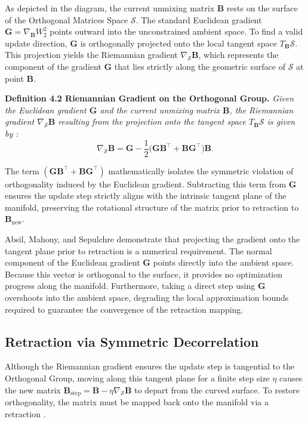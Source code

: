\documentclass[12pt,a4paper,twoside,openany]{book}
\begin{document}
As depicted in the diagram, the current unmixing matrix $\mathbf{B}$ rests on the surface of the Orthogonal Matrices Space $\mathcal{S}$. 
The standard Euclidean gradient $\mathbf{G} = \nabla_{\mathbf{B}} W_2^2$ points outward into the unconstrained ambient space. 
To find a valid update direction, $\mathbf{G}$ is orthogonally projected onto the local tangent space $T_{\mathbf{B}}\mathcal{S}$. 
This projection yields the Riemannian gradient $\nabla_{\mathcal{S}} \mathbf{B}$, which represents the component of the gradient $\mathbf{G}$ 
that lies strictly along the geometric surface of $\mathcal{S}$ at point $\mathbf{B}$.

\vspace{0.5em}
\noindent\textbf{Definition 4.2 Riemannian Gradient on the Orthogonal Group.} \textit{Given the Euclidean gradient $\mathbf{G}$ and the current unmixing matrix $\mathbf{B}$, 
the Riemannian gradient $\nabla_{\mathcal{S}} \mathbf{B}$ resulting from the projection onto the tangent space $T_{\mathbf{B}}\mathcal{S}$ 
is given by \cite[Chapter 3]{absil2008optimization}:}
\begin{equation}
    \nabla_{\mathcal{S}} \mathbf{B} = \mathbf{G} - \frac{1}{2}\big(\mathbf{G}\mathbf{B}^\top + \mathbf{B}\mathbf{G}^\top \big)\mathbf{B}.
\end{equation}
\vspace{0.5em}

The term $(\mathbf{G}\mathbf{B}^\top + \mathbf{B}\mathbf{G}^\top)$ mathematically isolates the symmetric violation of orthogonality induced 
by the Euclidean gradient. Subtracting this term from $\mathbf{G}$ ensures the update step strictly aligns with the intrinsic tangent plane of 
the manifold, preserving the rotational structure of the matrix prior to retraction to $\mathbf{B}_{\text{new}}$.

Absil, Mahony, and Sepulchre \citeyear[Chapter 3 and 4]{absil2008optimization} demonstrate that projecting the gradient onto the tangent plane prior to 
retraction is a numerical requirement. The normal component of the Euclidean gradient $\mathbf{G}$ points directly into the ambient space. 
Because this vector is orthogonal to the surface, it provides no optimization progress along the manifold. 
Furthermore, taking a direct step using $\mathbf{G}$ overshoots into the ambient space, degrading the local approximation bounds required to 
guarantee the convergence of the retraction mapping.


\subsection{Retraction via Symmetric Decorrelation}
Although the Riemannian gradient ensures the update step is tangential to the Orthogonal Group, 
moving along this tangent plane for a finite step size $\eta$ causes the new matrix $\mathbf{B}_{\text{step}} = \mathbf{B} - \eta \nabla_{\mathcal{S}} \mathbf{B}$ 
to depart from the curved surface. To restore orthogonality, the matrix must be mapped back onto the manifold 
via a retraction \cite[Chapter 4]{absil2008optimization}.
\end{document}
